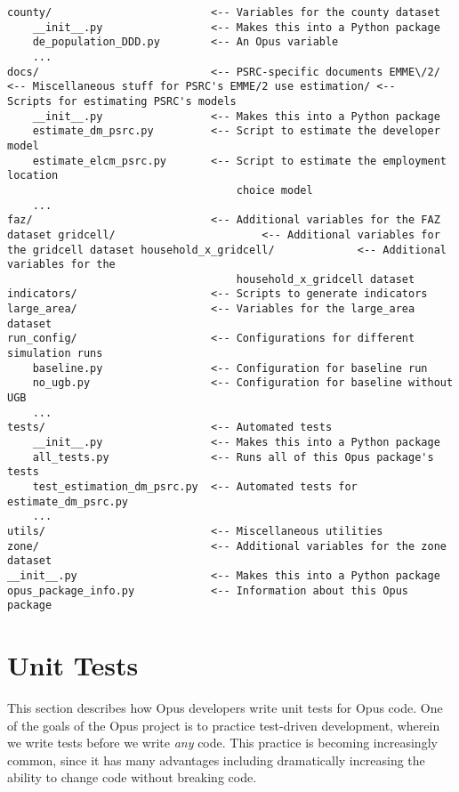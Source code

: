 \begin{verbatim}
county/                         <-- Variables for the county dataset
    __init__.py                 <-- Makes this into a Python package
    de_population_DDD.py        <-- An Opus variable
    ...
docs/                           <-- PSRC-specific documents EMME\/2/
<-- Miscellaneous stuff for PSRC's EMME/2 use estimation/ <--
Scripts for estimating PSRC's models
    __init__.py                 <-- Makes this into a Python package
    estimate_dm_psrc.py         <-- Script to estimate the developer model
    estimate_elcm_psrc.py       <-- Script to estimate the employment location
                                    choice model
    ...
faz/                            <-- Additional variables for the FAZ
dataset gridcell/                       <-- Additional variables for
the gridcell dataset household_x_gridcell/             <-- Additional
variables for the
                                    household_x_gridcell dataset
indicators/                     <-- Scripts to generate indicators
large_area/                     <-- Variables for the large_area dataset
run_config/                     <-- Configurations for different simulation runs
    baseline.py                 <-- Configuration for baseline run
    no_ugb.py                   <-- Configuration for baseline without UGB
    ...
tests/                          <-- Automated tests
    __init__.py                 <-- Makes this into a Python package
    all_tests.py                <-- Runs all of this Opus package's tests
    test_estimation_dm_psrc.py  <-- Automated tests for estimate_dm_psrc.py
    ...
utils/                          <-- Miscellaneous utilities
zone/                           <-- Additional variables for the zone dataset
__init__.py                     <-- Makes this into a Python package
opus_package_info.py            <-- Information about this Opus package
\end{verbatim}

\section{Unit Tests}
\label{sec:unit-tests}

This section describes how Opus developers write unit tests for Opus code. One
of the goals of the Opus project is to practice test-driven development,
wherein we write tests before we write \emph{any} code.  This practice is
becoming increasingly common, since it has many advantages including
dramatically increasing the ability to change code without breaking code.

